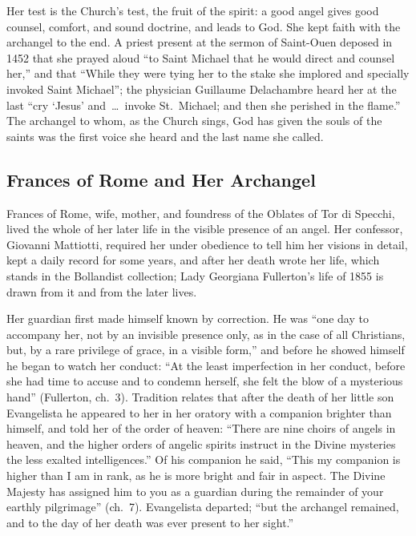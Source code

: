 Her test is the Church's test, the fruit of the spirit: a good angel gives
good counsel, comfort, and sound doctrine, and leads to God. She kept faith
with the archangel to the end. A priest present at the sermon of Saint-Ouen
deposed in 1452 that she prayed aloud ``to Saint Michael that he
would direct and counsel her,'' and that ``While they were tying her to the
stake she implored and specially invoked Saint Michael''; the physician
Guillaume Delachambre heard her at the last ``cry `Jesus' and~\dots\ invoke
St.\ Michael; and then she perished in the flame.'' The archangel to whom,
as the Church sings, God has given the souls of the saints was the first
voice she heard and the last name she called.

\sectionguard\subsection{Frances of Rome and Her Archangel}\label{sec:sa-frances}

Frances of Rome, wife, mother, and foundress of the Oblates of Tor di
Specchi, lived the whole of her later life in the visible presence of an
angel. Her confessor, Giovanni Mattiotti, required her under obedience to
tell him her visions in detail, kept a daily record for some years, and
after her death wrote her life, which stands in the Bollandist collection;
Lady Georgiana Fullerton's life of 1855 is drawn from it and from the later
lives.

Her guardian first made himself known by correction. He was ``one day to
accompany her, not by an invisible presence only, as in the case of all
Christians, but, by a rare privilege of grace, in a visible form,'' and
before he showed himself he began to watch her conduct: ``At the least
imperfection in her conduct, before she had time to accuse and to condemn
herself, she felt the blow of a mysterious hand'' (Fullerton, ch.~3).
Tradition relates that after the death of her little son Evangelista he
appeared to her in her oratory with a companion brighter than himself, and
told her of the order of heaven: ``There are nine choirs of angels in
heaven, and the higher orders of angelic spirits instruct in the Divine
mysteries the less exalted intelligences.'' Of his companion he said, ``This
my companion is higher than I am in rank, as he is more bright and fair in
aspect. The Divine Majesty has assigned him to you as a guardian during the
remainder of your earthly pilgrimage'' (ch.~7). Evangelista departed; ``but
the archangel remained, and to the day of her death was ever present to her
sight.''

